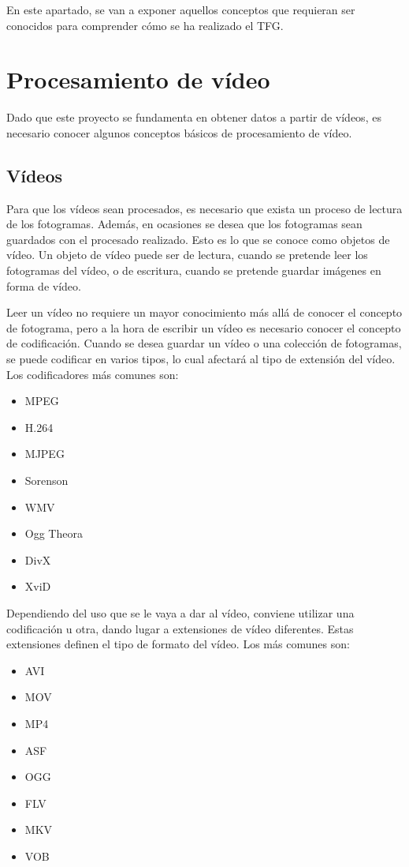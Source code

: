 
En este apartado, se van a exponer aquellos conceptos que requieran ser conocidos para comprender cómo se ha realizado el TFG.

\section{Procesamiento de vídeo}
Dado que este proyecto se fundamenta en obtener datos a partir de vídeos, es necesario conocer algunos conceptos básicos de procesamiento de vídeo.

\subsection{Vídeos}
Para que los vídeos sean procesados, es necesario que exista un proceso de lectura de los fotogramas. Además, en ocasiones se desea que los fotogramas sean guardados con el procesado realizado. Esto es lo que se conoce como objetos de vídeo. Un objeto de vídeo puede ser de lectura, cuando se pretende leer los fotogramas del vídeo, o de escritura, cuando se pretende guardar imágenes en forma de vídeo.

Leer un vídeo no requiere un mayor conocimiento más allá de conocer el concepto de fotograma, pero a la hora de escribir un vídeo es necesario conocer el concepto de codificación. Cuando se desea guardar un vídeo o una colección de fotogramas, se puede codificar en varios tipos, lo cual afectará al tipo de extensión del vídeo. Los codificadores más comunes son:
\begin{itemize}
	\item MPEG
	\item H.264
	\item MJPEG
	\item Sorenson
	\item WMV
	\item Ogg Theora
	\item DivX
	\item XviD	
\end{itemize}

Dependiendo del uso que se le vaya a dar al vídeo, conviene utilizar una codificación u otra, dando lugar a extensiones de vídeo diferentes. Estas extensiones definen el tipo de formato del vídeo. Los más comunes son:

\begin{itemize}
	\item AVI
	\item MOV
	\item MP4
	\item ASF
	\item OGG
	\item FLV
	\item MKV
	\item VOB
\end{itemize}

